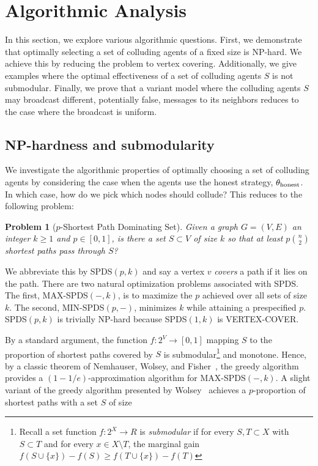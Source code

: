 \documentclass[reprint]{revtex4-1}
\newtheorem{problem}{Problem}[section]
\begin{document}
\section{Algorithmic Analysis}

In this section, we explore various algorithmic questions. First, we demonstrate that optimally selecting a set of colluding agents of a fixed size is NP-hard. We achieve this by reducing the problem to vertex covering. Additionally, we give examples where the optimal effectiveness of a set of colluding agents $S$ is not submodular. Finally, we prove that a variant model where the colluding agents $S$ may broadcast different, potentially false, messages to its neighbors reduces to the case where the broadcast is uniform.

\subsection{NP-hardness and submodularity} \label{sec:combinatorial}

We investigate the algorithmic properties of optimally choosing a set of colluding
agents by considering the case when the agents use the honest strategy, $\theta_{\textup{honest}}$. In which case, how do we pick which nodes should collude? This reduces to the following problem:

\begin{problem}[$p$-Shortest Path Dominating Set] \label{prob:spds}
Given a graph $G = (V,E)$ an integer $k \geq 1$ and $p \in [0,1]$, is there a
set $S \subset V$ of size $k$ so that at least $p \binom{n}{2}$ shortest paths
pass through $S$?
\end{problem}

We abbreviate this by SPDS$(p,k)$ and say a vertex $v$ \emph{covers} a path if
it lies on the path. There are two natural optimization problems associated
with SPDS. The first, MAX-SPDS$(-,k)$, is to maximize the $p$ achieved over all
sets of size $k$. The second, MIN-SPDS$(p,-)$, minimizes $k$ while attaining a
prespecified $p$. SPDS$(p,k)$ is trivially NP-hard because SPDS$(1, k)$ is
VERTEX-COVER.
 
By a standard argument, the function $f: 2^V \to [0,1]$ mapping $S$ to the
proportion of shortest paths covered by $S$ is submodular\footnote{Recall a set
function $f:2^X \to R$ is \emph{submodular} if for every $S, T \subset
X$ with $S \subset T$ and for every $x \in X \setminus T$, the marginal gain
$f(S \cup \{ x \}) - f(S) \geq f(T \cup \{ x \}) - f(T)$} and monotone.  Hence,
by a classic theorem of Nemhauser, Wolsey, and Fisher~\cite{NemhauserWF78}, the
greedy algorithm provides a $(1-1/e)$-approximation algorithm for
MAX-SPDS$(-,k)$. A slight variant of the greedy algorithm presented by
Wolsey~\cite{Wolsey82} achieves a $p$-proportion of shortest paths with a set
$S$ of size
\end{document}
